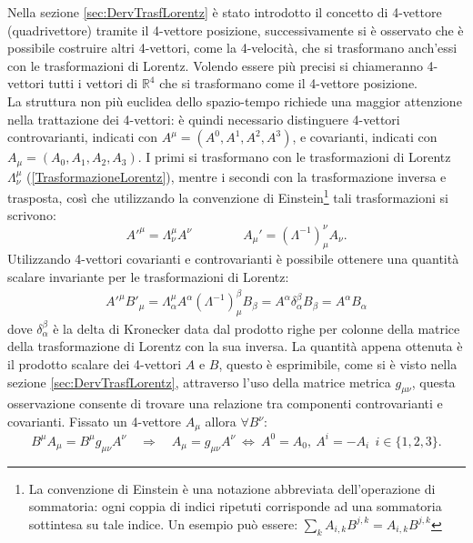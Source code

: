 
Nella sezione \ref{sec:DervTrasfLorentz} è stato introdotto il concetto di 4-vettore (quadrivettore) tramite il 4-vettore posizione, successivamente si è osservato che è possibile costruire altri 4-vettori, come la 4-velocità, che si trasformano anch'essi con le trasformazioni di Lorentz. Volendo essere più precisi si chiameranno 4-vettori tutti i vettori di $\mathbb{R}^4$ che si trasformano come il 4-vettore posizione.\\ 
La struttura non più euclidea dello spazio-tempo richiede una maggior attenzione nella trattazione dei 4-vettori: è quindi necessario distinguere 4-vettori controvarianti, indicati con $A^{\mu}=(A^0,A^1,A^2,A^3)$, e covarianti, indicati con $A_{\mu}=(A_0,A_1,A_2,A_3)$. I primi si trasformano con le trasformazioni di Lorentz $\Lambda_\nu^\mu$ (\ref{TrasformazioneLorentz}), mentre i secondi con la trasformazione inversa e trasposta, così che utilizzando la convenzione di Einstein\footnote{La convenzione di Einstein è una notazione abbreviata dell'operazione di sommatoria: ogni coppia di indici ripetuti corrisponde ad una sommatoria sottintesa su tale indice. Un esempio può essere: $\sum_k A_{i,k}B^{j,k}= A_{i,k}B^{j,k}$} tali trasformazioni si scrivono:
\begin{equation}
    A'^\mu =\Lambda_\nu^\mu A^\nu \qquad \qquad A_\mu '=(\Lambda^{-1} )^\nu_\mu A_\nu.
\end{equation}
Utilizzando 4-vettori covarianti e controvarianti è possibile ottenere una quantità scalare invariante per le trasformazioni di Lorentz:
\begin{eqnarray*}
    A'^\mu B'_\mu=\Lambda_\alpha^\mu A^\alpha (\Lambda^{-1} )^\beta_\mu B_\beta=A^\alpha \delta_\alpha^\beta B_\beta=A^\alpha B_\alpha
\end{eqnarray*}
dove $ \delta_\alpha^\beta$ è la delta di Kronecker data dal prodotto righe per colonne della matrice della trasformazione di Lorentz con la sua inversa. La quantità appena ottenuta è il prodotto scalare dei 4-vettori $A$ e $B$, questo è esprimibile, come si è visto nella sezione \ref{sec:DervTrasfLorentz}, attraverso l'uso della matrice metrica $g_{\mu \nu}$, questa osservazione consente di trovare una relazione tra componenti controvarianti e covarianti. Fissato un 4-vettore $A_\mu$ allora $\forall B^\nu$: 
\begin{equation}
    B^\mu A_\mu=B^\mu g_{\mu\nu} A^\nu \quad \Rightarrow\quad A_\mu=g_{\mu\nu}A^\nu \ \Leftrightarrow\ A^0=A_0,\ A^i=-A_i \ \ i\in\{1,2,3\}.
\end{equation}

